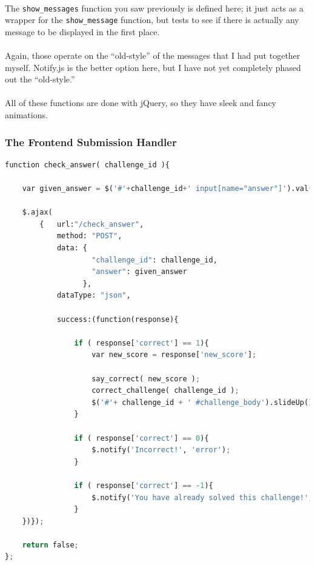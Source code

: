 \documentclass[11pt]{article}
\begin{document}
	
	\paragraph{} The \texttt{show\_messages} function you saw previously is defined here; it just acts as a wrapper for the \texttt{show\_message} function, but tests to see if there is actually any message to be displayed in the first place.

	\paragraph{} Again, those operate on the ``old-style'' of the messages that I had put together myself. Notify.js is the better option here, but I have not yet completely phased out the ``old-style.''

	\paragraph{}  All of these functions are done with jQuery, so they have sleek and fancy animations. 

	\newpage

	\subsubsection{The Frontend Submission Handler}

	\begin{lstlisting}[language=python]
function check_answer( challenge_id ){

	var given_answer = $('#'+challenge_id+' input[name="answer"]').val();

	$.ajax(
		{ 	url:"/check_answer",
			method: "POST",
			data: { 
					"challenge_id": challenge_id,
					"answer": given_answer
				  },
			dataType: "json",

			success:(function(response){

				if ( response['correct'] == 1){
					var new_score = response['new_score'];

					say_correct( new_score );
					correct_challenge( challenge_id );
					$('#'+ challenge_id + ' #challenge_body').slideUp();
				}

				if ( response['correct'] == 0){
					$.notify('Incorrect!', 'error');
				}

				if ( response['correct'] == -1){
					$.notify('You have already solved this challenge!', 'warn');
				}
	})});

	return false;
};
\end{lstlisting}
\end{document}
